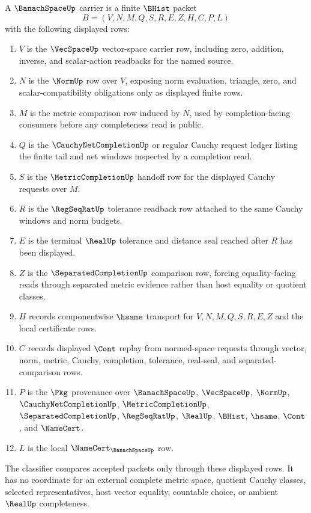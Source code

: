 \begin{definition}
\label{def:banach-space-carrier}
A $\BanachSpaceUp$ carrier is a finite $\BHist$ packet
$$
B=(V,N,M,Q,S,R,E,Z,H,C,P,L)
$$
with the following displayed rows:
\begin{enumerate}
\item $V$ is the $\VecSpaceUp$ vector-space carrier row, including zero, addition, inverse, and scalar-action readbacks for the named source.
\item $N$ is the $\NormUp$ row over $V$, exposing norm evaluation, triangle, zero, and scalar-compatibility obligations only as displayed finite rows.
\item $M$ is the metric comparison row induced by $N$, used by completion-facing consumers before any completeness read is public.
\item $Q$ is the $\CauchyNetCompletionUp$ or regular Cauchy request ledger listing the finite tail and net windows inspected by a completion read.
\item $S$ is the $\MetricCompletionUp$ handoff row for the displayed Cauchy requests over $M$.
\item $R$ is the $\RegSeqRatUp$ tolerance readback row attached to the same Cauchy windows and norm budgets.
\item $E$ is the terminal $\RealUp$ tolerance and distance seal reached after $R$ has been displayed.
\item $Z$ is the $\SeparatedCompletionUp$ comparison row, forcing equality-facing reads through separated metric evidence rather than host equality or quotient classes.
\item $H$ records componentwise $\hsame$ transport for $V,N,M,Q,S,R,E,Z$ and the local certificate rows.
\item $C$ records displayed $\Cont$ replay from normed-space requests through vector, norm, metric, Cauchy, completion, tolerance, real-seal, and separated-comparison rows.
\item $P$ is the $\Pkg$ provenance over $\BanachSpaceUp$, $\VecSpaceUp$, $\NormUp$, $\CauchyNetCompletionUp$, $\MetricCompletionUp$, $\SeparatedCompletionUp$, $\RegSeqRatUp$, $\RealUp$, $\BHist$, $\hsame$, $\Cont$, and $\NameCert$.
\item $L$ is the local $\NameCert_{\BanachSpaceUp}$ row.
\end{enumerate}
The classifier compares accepted packets only through these displayed rows. It has no coordinate for an external complete metric space, quotient Cauchy classes, selected representatives, host vector equality, countable choice, or ambient $\RealUp$ completeness.
\end{definition}

